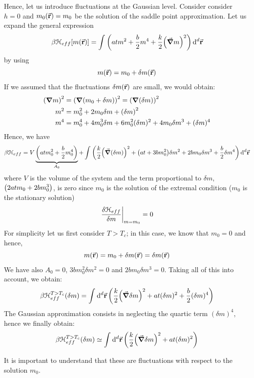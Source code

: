 \documentclass[../main/main.tex]{subfiles}
\begin{document}
Hence, let us introduce fluctuations at the Gaussian level. Consider consider \( h=0 \) and \( m_0 (\va{r})= m_0 \) be the solution of the saddle point approximation. Let us expand the general expression
\begin{equation*}
  \beta \mathcal{H}_{eff}  [m (\va{r})] = \int_{}^{}  \qty( a t m^2 + \frac{b}{2} m^4 + \frac{k}{2} \qty(\va{\grad } m)^2 ) \dd[d]{\va{r}}
\end{equation*}
by using
\begin{equation*}
  m(\va{r}) = m_0 + \delta m(\va{r})
\end{equation*}
If we assumed that the fluctuations \(  \delta m(\va{r})\) are small, we would obtain:
\begin{subequations}
\begin{align*}
   \qty(\grad m)^2 &= \qty(\grad \qty(m_0 + \delta m) )^2 = \qty(\grad \qty(\delta m) )^2  \\
     m^2 &= m_0^2 + 2 m_0 \delta m + \qty(\delta m)^2 \\
     m^4 &= m_0^4 + 4 m_0^3 \delta m + 6 m_0^2 (\delta m)^2 + 4 m_0 \delta m^3 + (\delta m)^4
\end{align*}
\end{subequations}
Hence, we have
\begin{equation}
  \beta \mathcal{H}_{eff} = V \underbrace{ \qty(a t m_0^2 + \frac{b}{2} m_0^4) }_{A_0}
  + \int_{}^{} \qty(\frac{k}{2}\qty( \va{\grad } (\delta m))^2 + \qty(a t + 3 b m_0^2)\delta  m^2 + 2 b m_0 \delta m^3 + \frac{b}{2} \delta m^4 )\dd[d]{\va{r}}
  \label{eq:18_10}
\end{equation}
where \( V \) is the volume of the system and the term proportional to \( \delta m \),  \( \qty( 2 a t m_0  +  2b m_0^3 )  \), is zero since \( m_0 \) is the solution of the extremal condition (\( m_0 \) is the stationary solution)
\begin{equation*}
  \eval{\frac{\delta \mathcal{H}_{eff}}{\delta m}}_{m=m_0} = 0
\end{equation*}
For simplicity let us first consider \( T>T_c \); in this case, we know that \( m_0 = 0 \) and hence,
\begin{equation*}
   m (\va{r}) = m_0 + \delta m(\va{r}) = \delta m (\va{r})
\end{equation*}
We have also \( A_0 =0 \),  \( 3bm_0^2 \delta m^2 = 0 \) and \( 2 b m_0 \delta m^3 = 0 \). Taking all of this into account, we obtain:
\begin{equation*}
  \beta \mathcal{H}_{eff}^{T>T_c} (\delta m)= \int_{}^{} \dd[d]{\va{r}} \qty(\frac{k}{2} \qty(\va{\grad }\delta m)^2 + a t (\delta m)^2 + \frac{b}{2} (\delta m)^4 )
\end{equation*}
The Gaussian approximation consists in neglecting the quartic term \( (\delta m)^4 \), hence we finally obtain:
\begin{equation}
    \beta \mathcal{H}_{eff}^{T>T_c} (\delta m) \simeq  \int_{}^{} \dd[d]{\va{r}} \qty(\frac{k}{2} \qty( \va{\grad } \delta m)^2 + a t (\delta m)^2 )
    \label{eq:18_4}
\end{equation}
\begin{remark}
It is important to understand that these are fluctuations with respect to the solution \( m_0 \).
\end{remark}
\end{document}
